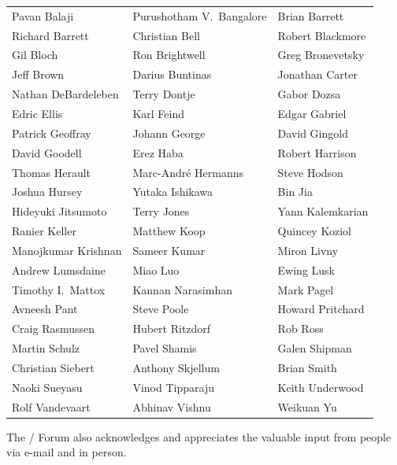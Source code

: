 \begin{center}
\begin{tabular}{lll}
Pavan Balaji &
Purushotham V.~Bangalore &
Brian Barrett \\
Richard Barrett&
Christian Bell &
Robert Blackmore\\
Gil Bloch &
Ron Brightwell&
Greg Bronevetsky\\
Jeff Brown &
Darius Buntinas&
Jonathan Carter\\
Nathan DeBardeleben&
Terry Dontje&
Gabor Dozsa\\
Edric Ellis&
Karl Feind&
Edgar Gabriel\\
Patrick Geoffray &
Johann George&
David Gingold\\
David Goodell&
Erez Haba &
Robert Harrison\\
Thomas Herault &
Marc-Andr\'e Hermanns&
Steve Hodson\\
Joshua Hursey&
Yutaka Ishikawa&
Bin Jia\\
Hideyuki Jitsumoto&
Terry Jones&
Yann Kalemkarian\\
Ranier Keller&
Matthew Koop&
Quincey Koziol\\
Manojkumar Krishnan&
Sameer Kumar &
Miron Livny\\
Andrew Lumsdaine&
Miao Luo&
Ewing Lusk\\
Timothy I.~Mattox&
Kannan Narasimhan&
Mark Pagel\\
Avneesh Pant&
Steve Poole &
Howard Pritchard\\
Craig Rasmussen&
Hubert Ritzdorf&
Rob Ross\\
Martin Schulz&
Pavel Shamis&
Galen Shipman\\
Christian Siebert&
Anthony Skjellum&
Brian Smith\\
Naoki Sueyasu&
Vinod Tipparaju &
Keith Underwood\\
Rolf Vandevaart&
Abhinav Vishnu & 
Weikuan Yu
\end{tabular}
\end{center}

The \MPI/ Forum also acknowledges and appreciates the valuable input
from people via e-mail and in person.

